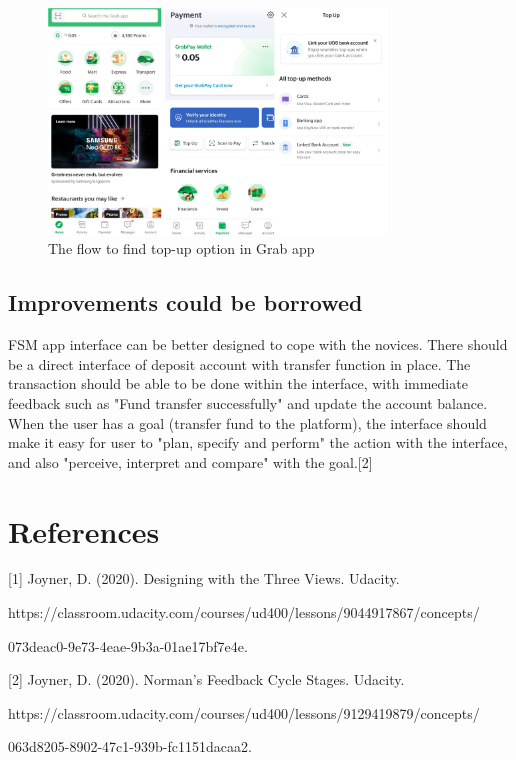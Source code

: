 \documentclass[
	letterpaper, %
]{jdf}
\begin{document}
\begin{figure}[h]
	\centering
	\includegraphics[height=6cm]{Figures/grab_wallet.jpg}
	\caption{The flow to find top-up option in Grab app}
	\label{fig:grab_wallet}
\end{figure}

\subsection{Improvements could be borrowed}
FSM app interface can be better designed to cope with the novices. There should be a direct interface of deposit account with transfer function in place. The transaction should be able to be done within the interface, with immediate feedback such as "Fund transfer successfully" and update the account balance. When the user has a goal (transfer fund to the platform), the interface should make it easy for user to "plan, specify and perform" the action with the interface, and also "perceive, interpret and compare" with the goal.[2] 

\section{References}
[1] Joyner, D. (2020). Designing with the Three Views. Udacity. 

https://classroom.udacity.com/courses/ud400/lessons/9044917867/concepts/

073deac0-9e73-4eae-9b3a-01ae17bf7e4e. 

[2] Joyner, D. (2020). Norman's Feedback Cycle Stages. Udacity. 

https://classroom.udacity.com/courses/ud400/lessons/9129419879/concepts/

063d8205-8902-47c1-939b-fc1151dacaa2. 
\end{document}
